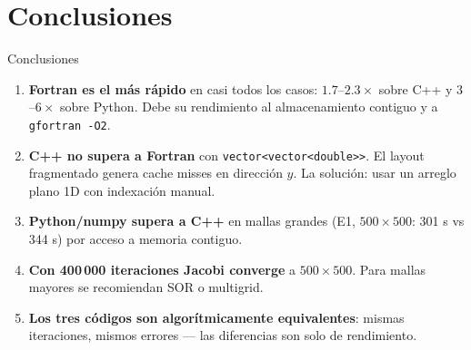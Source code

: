 \documentclass[aspectratio=169, 11pt]{beamer}
\begin{document}
\section{Conclusiones}

\begin{frame}{Conclusiones}
  \begin{enumerate}
    \setlength\itemsep{0.3cm}
    \item \textbf{Fortran es el más rápido} en casi todos los casos:
          $1.7$–$2.3\times$ sobre C++ y $3$–$6\times$ sobre Python.
          Debe su rendimiento al almacenamiento contiguo y a \texttt{gfortran -O2}.

    \item \textbf{C++ no supera a Fortran} con \texttt{vector<vector<double>>}.
          El layout fragmentado genera cache misses en dirección $y$.
          La solución: usar un arreglo plano 1D con indexación manual.

    \item \textbf{Python/numpy supera a C++} en mallas grandes
          (E1, $500\times500$: 301 s vs 344 s) por acceso a memoria contiguo.

    \item \textbf{Con 400\,000 iteraciones Jacobi converge} a $500\times500$.
          Para mallas mayores se recomiendan SOR o multigrid.

    \item \textbf{Los tres códigos son algorítmicamente equivalentes}:
          mismas iteraciones, mismos errores — las diferencias son solo de rendimiento.
  \end{enumerate}
\end{frame}
\end{document}
